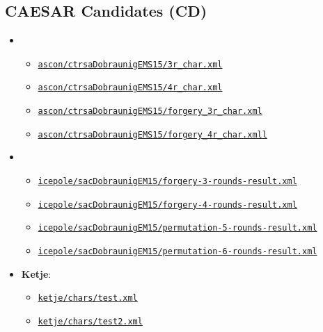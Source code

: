 \documentclass[11pt, a4paper]{article}
\newcommand{\hashlink}[2][black]{\href{https://extgit.iaik.tugraz.at/krypto/nldtool/blob/master/hash/#2}{\color{#1}\nolinkurl{#2}}}
\begin{document}

%


\subsection{CAESAR Candidates (CD)}

\begin{itemize}
  \item {}
    \begin{itemize}
      \item \hashlink[done]{ascon/ctrsaDobraunigEMS15/3r_char.xml}
      \item \hashlink[done]{ascon/ctrsaDobraunigEMS15/4r_char.xml}
      \item \hashlink[done]{ascon/ctrsaDobraunigEMS15/forgery_3r_char.xml}
      \item \hashlink[done]{ascon/ctrsaDobraunigEMS15/forgery_4r_char.xmll}
    \end{itemize}
  \item {}
    \begin{itemize}
      \item \hashlink[done]{icepole/sacDobraunigEM15/forgery-3-rounds-result.xml}
      \item \hashlink[done]{icepole/sacDobraunigEM15/forgery-4-rounds-result.xml}
      \item \hashlink[done]{icepole/sacDobraunigEM15/permutation-5-rounds-result.xml}
      \item \hashlink[done]{icepole/sacDobraunigEM15/permutation-6-rounds-result.xml}
    \end{itemize}
  \item \textbf{Ketje}:
    \begin{itemize}
      \item \hashlink[todo]{ketje/chars/test.xml}
      \item \hashlink[todo]{ketje/chars/test2.xml}
    \end{itemize}
\end{itemize}
\end{document}

